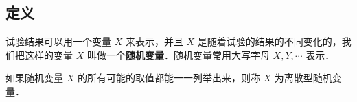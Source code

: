 
\subsection{定义}
试验结果可以用一个变量 $X$ 来表示，并且 $X$ 是随着试验的结果的不同变化的，我们把这样的变量 $X$ 叫做一个\textbf{随机变量}．随机变量常用大写字母 $X,Y,\cdots$ 表示．

如果随机变量  $X$ 的所有可能的取值都能一一列举出来，则称 $X$ 为离散型随机变量．

\sub